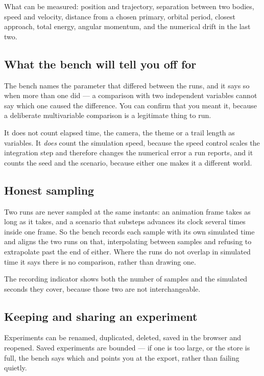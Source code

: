 \documentclass[11pt,a4paper]{article}
\begin{document}
What can be measured: position and trajectory, separation between two bodies,
speed and velocity, distance from a chosen primary, orbital period, closest
approach, total energy, angular momentum, and the numerical drift in the last
two.

\subsection{What the bench will tell you off for}

The bench names the parameter that differed between the runs, and it says so
when more than one did --- a comparison with two independent variables cannot
say which one caused the difference. You can confirm that you meant it, because
a deliberate multivariable comparison is a legitimate thing to run.

It does not count elapsed time, the camera, the theme or a trail length as
variables. It \emph{does} count the simulation speed, because the speed
control scales the integration step and therefore changes the numerical error a
run reports, and it counts the seed and the scenario, because either one makes
it a different world.

\subsection{Honest sampling}

Two runs are never sampled at the same instants: an animation frame takes as
long as it takes, and a scenario that substeps advances its clock several times
inside one frame. So the bench records each sample with its own simulated time
and aligns the two runs on that, interpolating between samples and refusing to
extrapolate past the end of either. Where the runs do not overlap in simulated
time it says there is no comparison, rather than drawing one.

The recording indicator shows both the number of samples and the simulated
seconds they cover, because those two are not interchangeable.

\subsection{Keeping and sharing an experiment}

Experiments can be renamed, duplicated, deleted, saved in the browser and
reopened. Saved experiments are bounded --- if one is too large, or the store
is full, the bench says which and points you at the export, rather than
failing quietly.
\end{document}

